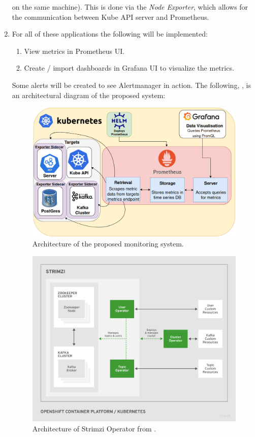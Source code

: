 \begin{enumerate}
	      on the same machine). This is done via the \emph{Node Exporter}, which allows for the communication between Kube API server
	      and Prometheus.
	\item For all of these applications the following will be implemented:
	      \begin{enumerate}
		      \item View metrics in Prometheus UI.
		      \item Create / import dashboards in Grafana UI to visualize the metrics.
	      \end{enumerate}
	      Some alerts will be created to see Alertmanager in action.
	      \bigbreak
		  The following, , is an architectural diagram of the proposed system:
	      \begin{figure}[H]
		      \centering
		      \includegraphics[width=0.7\linewidth]{figures/cloud_2_term_paper_initial_architecture.png}
		      \caption{Architecture of the proposed monitoring system.}
		      \label{fig:system_architecture}
	      \end{figure}
	      \begin{figure}[H]
		      \centering
		      \includegraphics[width=0.7\linewidth]{figures/strimzi_architecture.png}
		      \caption{Architecture of Strimzi Operator from \autocite{StrimziDocumentation12}.}
		      \label{fig:strimzi_archi}
	      \end{figure}
\end{enumerate}
\pagebreak
